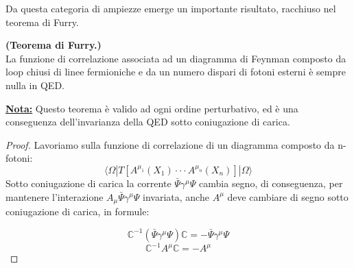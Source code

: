 \documentclass[../main.tex]{subfiles}
\begin{document}
\begin{enumerate}
                Da questa categoria di ampiezze emerge un importante risultato, racchiuso nel teorema di Furry.
                \begin{theorem}
                \textbf{(Teorema di Furry.)}\\
                La funzione di correlazione associata ad un diagramma di Feynman composto da loop chiusi di linee fermioniche e da un numero dispari di fotoni esterni è sempre nulla in QED.
                \end{theorem}
                \underline{\textbf{Nota:}} Questo teorema è valido ad ogni ordine perturbativo, ed è una conseguenza dell'invarianza della QED sotto coniugazione di carica.
                
                \begin{proof}
                Lavoriamo sulla funzione di correlazione di un diagramma composto da n-fotoni:
                \[\langle\Omega|T[A^{\mu_1}(X_1)\cdot\cdot\cdot A^{\mu_n}(X_n)]|\Omega\rangle\]
                Sotto coniugazione di carica la corrente $\bar\Psi\gamma^\mu\Psi$ cambia segno, di conseguenza, per mantenere l'interazione $A_\mu\bar\Psi\gamma^\mu\Psi$ invariata, anche $A^\mu$ deve cambiare di segno sotto coniugazione di carica, in formule:
                
                \[\mathbb{C}^{-1} (\bar\Psi\gamma^\mu\Psi) \mathbb{C} = - \bar\Psi\gamma^\mu\Psi\]
                \[
                \mathbb{C}^{-1} A^\mu \mathbb{C} = - A^\mu
                \]


\end{proof}
\end{enumerate}
\end{document}
